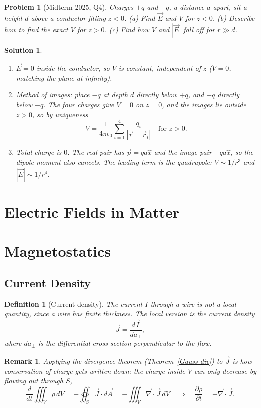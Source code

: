 \documentclass{article}
\newtheorem{definition}{Definition}
\newtheorem{problem}{Problem}
\newtheorem{solution}{Solution}
\newtheorem{remark}{Remark}
\begin{document}
\begin{problem}[Midterm 2025, Q4]
    Charges $+q$ and $-q$, a distance $a$ apart, sit a height $d$ above a conductor filling $z < 0$. (a) Find $\vec{E}$ and $V$ for $z < 0$. (b) Describe how to find the exact $V$ for $z > 0$. (c) Find how $V$ and $|\vec{E}|$ fall off for $r \gg d$.
\end{problem}
\begin{solution}
    \begin{enumerate}[label=(\alph*)]
        \item $\vec{E} = 0$ inside the conductor, so $V$ is constant, independent of $z$ ($V = 0$, matching the plane at infinity).
        \item Method of images: place $-q$ at depth $d$ directly below $+q$, and $+q$ directly below $-q$. The four charges give $V = 0$ on $z = 0$, and the images lie outside $z > 0$, so by uniqueness
        \[V = \frac{1}{4\pi\epsilon_0}\sum_{i=1}^{4}\frac{q_i}{|\vec{r} - \vec{r}_i|}\quad\text{for } z > 0.\]
        \item Total charge is $0$. The real pair has $\vec{p} = qa\hat{x}$ and the image pair $-qa\hat{x}$, so the dipole moment also cancels. The leading term is the quadrupole: $V \sim 1/r^3$ and $|\vec{E}| \sim 1/r^4$.
    \end{enumerate}
\end{solution}


\section{Electric Fields in Matter}


\section{Magnetostatics}

\subsection{Current Density}
\begin{definition}[Current density]
    The current $I$ through a wire is not a local quantity, since a wire has finite thickness. The local version is the current density
    \[\vec{J} = \frac{d\vec{I}}{da_\perp},\]
    where $da_\perp$ is the differential cross section perpendicular to the flow.
\end{definition}
\begin{remark}
    Applying the divergence theorem (Theorem~\ref{Gauss-div}) to $\vec{J}$ is how conservation of charge gets written down: the charge inside $V$ can only decrease by flowing out through $S$,
    \[\frac{d}{dt}\iiint_V\rho\, dV = - \oiint_S\vec{J}\cdot d\vec{A} = -\iiint_V \vec{\nabla}\cdot\vec{J}\,dV \quad\Longrightarrow\quad \frac{\partial\rho}{\partial t} = -\vec{\nabla}\cdot\vec{J}.\]
\end{remark}
\end{document}
